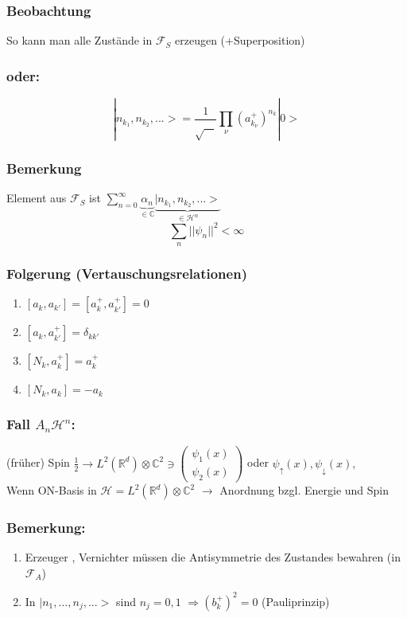 \documentclass[twoside,a4paper]{scrartcl}
\newcommand{\R}{\mathbb{R}}
\newcommand{\C}{\mathbb{C}}
\renewcommand{\1}{\mathds{1}}
\newcommand{\Ra}{\Rightarrow}
\newcommand{\ra}{\rightarrow}
\renewcommand{\H}{\mathcal{H}}
\newcommand{\F}{\mathcal{F}}
\renewcommand{\R}{\mathbb{R}}
\renewcommand{\C}{\mathbb{C}}
\begin{document}
\subsubsection*{Beobachtung} 
So kann man alle Zustände in $\F_S$ erzeugen (+Superposition) 
\subsubsection*{oder:} 
$$|n_{k_1},n_{k_2},...>=\frac{1}{\sqrt{\ \ \ \ }}\prod_\nu (a^+_{k_\nu})^{n_k}|0>$$
\subsubsection*{Bemerkung} 
Element aus $\F_S$ ist $\sum_{n=0}^\infty \underbrace{\alpha_n}_{\in \C}\underbrace{|n_{k_1},n_{k_2},...>}_{\in \H^n} $
$$\sum_n ||\psi_n||^2<\infty$$
\subsubsection*{Folgerung (Vertauschungsrelationen)} 
 \begin{enumerate}
\item $[a_k,a_{k'}]=[a_k^+,a_{k'}^+]=0$
\item $[a_k,a_{k'}^+]=\delta_{kk'}$
\item $[N_k,a_k^+]=a_k^+$
\item $[N_k,a_k]=-a_k$
\end{enumerate}
\subsubsection*{Fall $A_n\H^n$:}
(früher) Spin $\frac{1}{2} \ra L^2(\R^d)\otimes \C^2 \ni \begin{pmatrix} \psi_1(x) \\ \psi_2(x) \end{pmatrix}$ oder $\psi_\uparrow(x), \psi_\downarrow(x),$\\
Wenn ON-Basis in $\H=L^2(\R^d)\otimes \C^2$ $\ra$ Anordnung bzgl. Energie und Spin
\subsubsection*{Bemerkung:}
\begin{enumerate}
\item Erzeuger , Vernichter müssen die Antisymmetrie des Zustandes bewahren (in $\F_A$)
\item In $|n_1,...,n_j,...>$ sind $n_j=0,1$ $\Ra (b_k^+)^2=0$ (Pauliprinzip)
\end{enumerate}
\end{document}
